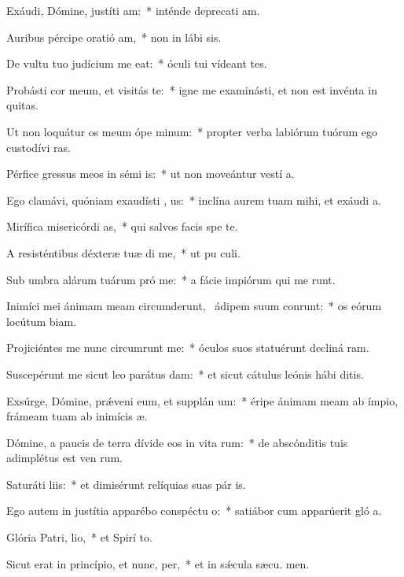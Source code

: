 \item Exáudi, Dómine, justíti am:~* inténde deprecati am.
\item Auribus pércipe oratió am,~* non in lábi sis.
\item De vultu tuo judícium me eat:~* óculi tui vídeant tes.
\item Probásti cor meum, et visitás te:~* igne me examinásti, et non est invénta in  quitas.
\item Ut non loquátur os meum ópe minum:~* propter verba labiórum tuórum ego custodívi  ras.
\item Pérfice gressus meos in sémi is:~* ut non moveántur vestí a.
\item Ego clamávi, quóniam exaudísti , us:~* inclína aurem tuam mihi, et exáudi  a.
\item Mirífica misericórdi as,~* qui salvos facis spe  te.
\item A resisténtibus déxteræ tuæ di me,~* ut pu culi.
\item Sub umbra alárum tuárum pró me:~* a fácie impiórum qui me runt.
\item Inimíci mei ánimam meam circumderunt,~\pscross{} ádipem suum conrunt:~* os eórum locútum  biam.
\item Projiciéntes me nunc circumrunt me:~* óculos suos statuérunt decliná  ram.
\item Suscepérunt me sicut leo parátus  dam:~* et sicut cátulus leónis hábi  ditis.
\item Exsúrge, Dómine, prǽveni eum, et supplán um:~* éripe ánimam meam ab ímpio, frámeam tuam ab inimícis  æ.
\item Dómine, a paucis de terra dívide eos in vita rum:~* de abscónditis tuis adimplétus est ven rum.
\item Saturáti  liis:~* et dimisérunt relíquias suas pár is.
\item Ego autem in justítia apparébo conspéctu o:~* satiábor cum apparúerit gló a.
\item Glória Patri,  lio,~* et Spirí to.
\item Sicut erat in princípio, et nunc,  per,~* et in sǽcula sæcu. men.
